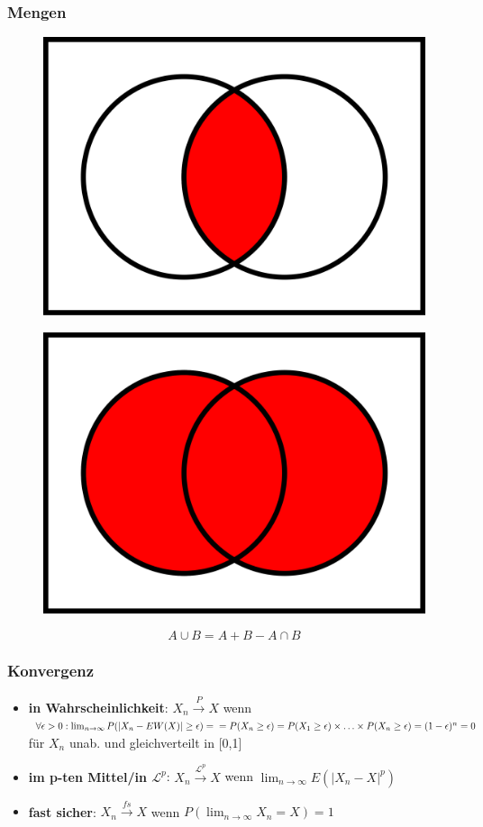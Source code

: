 \subsubsection{Mengen}

\begin{figure}[ht]
    \centering
    \begin{minipage}{.5\textwidth}
      \centering
      \includegraphics[width=.4\linewidth]{mehrdimWktrechnung/Venn0001.svg.png}
      \label{fig:schnittmenge}
    \end{minipage}%
    \begin{minipage}{.5\textwidth}
      \centering
      \includegraphics[width=.4\linewidth]{mehrdimWktrechnung/Venn0111.svg.png}
      \label{fig:vereinigungsmenge}
    \end{minipage}
\end{figure}

\begin{equation*}
    A\cup B = A+B-A\cap B
\end{equation*}

\subsubsection{Konvergenz}

\begin{itemize}
    \item \textbf{in Wahrscheinlichkeit}: \(X_n \xrightarrow{P} X\) wenn \(\forall \epsilon > 0: \lim_{n\rightarrow\infty}P(|X_n-EW(X)| \geq\epsilon)=\\=P(X_n \geq\epsilon)=P(X_1\geq\epsilon)\times \hdots \times P(X_n\geq\epsilon)=(1-\epsilon)^n = 0\) für \(X_n\) unab. und gleichverteilt in [0,1]
    \item \textbf{im p-ten Mittel/in \(\mathcal{L}^p\)}: \(X_n \xrightarrow{\mathcal{L}^p} X\) wenn \(\lim_{n\rightarrow\infty}E(|X_n-X|^p)\)
    \item \textbf{fast sicher}: \(X_n \xrightarrow{fs} X\) wenn \(P(\lim_{n\rightarrow\infty}X_n=X)=1\)
\end{itemize}

